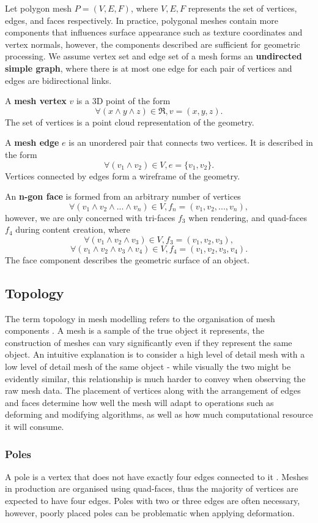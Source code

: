 \documentclass[ %
author={Dillon Keith Diep},
supervisor={Dr. Carl Henrik Ek},
degree={MEng},
title={ART-CG Hair:},
subtitle={Assisted Real-time Content Generation of Stylised Virtual Hair},
type={Research},
year={2017} ]{dissertation}
\begin{document}
Let polygon mesh $P = (V, E, F)$, where $V, E, F$ represents the set of vertices, edges, and faces respectively. In practice, polygonal meshes contain more components that influences surface appearance such as texture coordinates and vertex normals, however, the components described are sufficient for geometric processing. We assume vertex set and edge set of a mesh forms an \textbf{undirected simple graph}, where there is at most one edge for each pair of vertices and edges are bidirectional links.

A \textbf{mesh vertex} $v$ is a 3D point of the form
$$\forall (x \land y \land z) \in \Re, v = (x, y, z).$$
The set of vertices is a point cloud representation of the geometry. 

A \textbf{mesh edge} $e$ is an unordered pair that connects two vertices. It is described in the form
$$\forall (v_1 \land v_2) \in V, e = \{v_1, v_2\}.$$
Vertices connected by edges form a wireframe of the geometry. 

An \textbf{n-gon face} is formed from an arbitrary number of vertices 
$$\forall (v_1 \land v_2 \land ... \land v_n) \in V, f_n = (v_1, v_2,..., v_n),$$ 
however, we are only concerned with tri-faces $f_3$ when rendering, and quad-faces $f_4$ during content creation, where
$$\forall (v_1 \land v_2 \land v_3) \in V, f_3 = (v_1, v_2, v_3),$$
$$\forall (v_1 \land v_2 \land v_3 \land v_4) \in V, f_4 = (v_1, v_2, v_3, v_4).$$
The face component describes the geometric surface of an object.

\subsection{Topology}
The term topology in mesh modelling refers to the organisation of mesh components \cite[p.91]{blenderstudio}. A mesh is a sample of the true object it represents, the construction of meshes can vary significantly even if they represent the same object. An intuitive explanation is to consider a high level of detail mesh with a low level of detail mesh of the same object - while visually the two might be evidently similar, this relationship is much harder to convey when observing the raw mesh data. The placement of vertices along with the arrangement of edges and faces determine how well the mesh will adapt to operations such as deforming and modifying algorithms, as well as how much computational resource it will consume.

\subsubsection{Poles}
A pole is a vertex that does not have exactly four edges connected to it \cite[p.92]{blenderstudio}. Meshes in production are organised using quad-faces, thus the majority of vertices are expected to have four edges. Poles with two or three edges are often necessary, however, poorly placed poles can be problematic when applying deformation.
\end{document}
